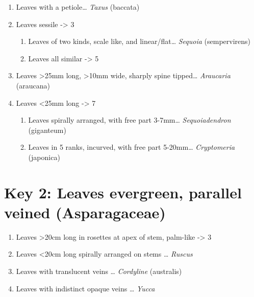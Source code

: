 \documentclass[openany]{book}
\providecommand{\tightlist}{%
  \setlength{\itemsep}{0pt}\setlength{\parskip}{0pt}}
\begin{document}
\begin{enumerate}
\def\labelenumi{\arabic{enumi}.}
\tightlist
\item
  Leaves with a petiole\ldots{} \emph{Taxus} (baccata)
\item
  Leaves sessile -\textgreater{} 3

  \begin{enumerate}
  \def\labelenumii{\arabic{enumii}.}
  \setcounter{enumii}{2}
  \tightlist
  \item
    Leaves of two kinds, scale like, and linear/flat\ldots{}
    \emph{Sequoia} (sempervirens)
  \item
    Leaves all similar -\textgreater{} 5
  \end{enumerate}
\item
  Leaves \textgreater{}25mm long, \textgreater{}10mm wide, sharply spine
  tipped\ldots{} \emph{Araucaria} (araucana)
\item
  Leaves \textless{}25mm long -\textgreater{} 7

  \begin{enumerate}
  \def\labelenumii{\arabic{enumii}.}
  \setcounter{enumii}{6}
  \tightlist
  \item
    Leaves spirally arranged, with free part 3-7mm\ldots{}
    \emph{Sequoiadendron} (giganteum)
  \item
    Leaves in 5 ranks, incurved, with free part 5-20mm\ldots{}
    \emph{Cryptomeria} (japonica)
  \end{enumerate}
\end{enumerate}

\hypertarget{key-2-leaves-evergreen-parallel-veined-asparagaceae-1}{%
\section{Key 2: Leaves evergreen, parallel veined
(Asparagaceae)}\label{key-2-leaves-evergreen-parallel-veined-asparagaceae-1}}

\begin{enumerate}
\def\labelenumi{\arabic{enumi}.}
\tightlist
\item
  Leaves \textgreater{}20cm long in rosettes at apex of stem, palm-like
  -\textgreater{} 3
\item
  Leaves \textless{}20cm long spirally arranged on stems \ldots{}
  \emph{Ruscus}
\item
  Leaves with translucent veins \ldots{} \emph{Cordyline} (australis)
\item
  Leaves with indistinct opaque veins \ldots{} \emph{Yucca}
\end{enumerate}
\end{document}
